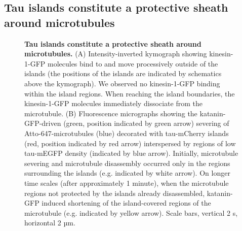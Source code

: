 \subsection{Tau islands constitute a protective sheath around microtubules}
\begin{figure}[h!tb]
\centering
\caption[Tau islands constitute a protective sheath around microtubules.]{
\textbf{Tau islands constitute a protective sheath around microtubules.} (A) Intensity-inverted kymograph showing kinesin-1-GFP molecules bind to and move processively outside of the islands (the positions of the islands are indicated by schematics above the kymograph). We observed no kinesin-1-GFP binding within the island regions. When reaching the island boundaries, the kinesin-1-GFP molecules immediately dissociate from the microtubule. (B) Fluorescence micrographs showing the katanin-GFP-driven (green, position indicated by green arrow) severing of Atto-647-microtubules (blue) decorated with tau-mCherry islands (red, position indicated by red arrow) interspersed by regions of low tau-mEGFP density (indicated by blue arrow). Initially, microtubule severing and microtubule disassembly occurred only in the regions surrounding the islands (e.g. indicated by white arrow). On longer time scales (after approximately 1 minute), when the microtubule regions not protected by the islands already disassembled, katanin-GFP induced shortening of the island-covered regions of the microtubule (e.g. indicated by yellow arrow). Scale bars, vertical 2 s, horizontal 2 µm.   
	}\label{tau3}
\end{figure}
